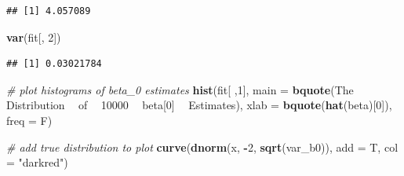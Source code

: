 \documentclass[]{book}
\newenvironment{Shaded}{\begin{snugshade}}{\end{snugshade}}
\newcommand{\KeywordTok}[1]{\textcolor[rgb]{0.13,0.29,0.53}{\textbf{#1}}}
\newcommand{\DataTypeTok}[1]{\textcolor[rgb]{0.13,0.29,0.53}{#1}}
\newcommand{\DecValTok}[1]{\textcolor[rgb]{0.00,0.00,0.81}{#1}}
\newcommand{\StringTok}[1]{\textcolor[rgb]{0.31,0.60,0.02}{#1}}
\newcommand{\CommentTok}[1]{\textcolor[rgb]{0.56,0.35,0.01}{\textit{#1}}}
\newcommand{\ControlFlowTok}[1]{\textcolor[rgb]{0.13,0.29,0.53}{\textbf{#1}}}
\newcommand{\OperatorTok}[1]{\textcolor[rgb]{0.81,0.36,0.00}{\textbf{#1}}}
\newcommand{\NormalTok}[1]{#1}
\theoremstyle{definition}
\theoremstyle{definition}
\theoremstyle{definition}
\theoremstyle{remark}
\begin{document}
\begin{Shaded}
\end{Shaded}

\begin{verbatim}
## [1] 4.057089
\end{verbatim}

\begin{Shaded}
\begin{Highlighting}[]
\KeywordTok{var}\NormalTok{(fit[, }\DecValTok{2}\NormalTok{])}
\end{Highlighting}
\end{Shaded}

\begin{verbatim}
## [1] 0.03021784
\end{verbatim}

\begin{Shaded}
\begin{Highlighting}[]
\CommentTok{# plot histograms of beta_0 estimates}
\KeywordTok{hist}\NormalTok{(fit[ ,}\DecValTok{1}\NormalTok{], }
     \DataTypeTok{main =} \KeywordTok{bquote}\NormalTok{(The }\OperatorTok{~}\StringTok{ }\NormalTok{Distribution  }\OperatorTok{~}\StringTok{ }\NormalTok{of }\OperatorTok{~}\StringTok{ }\DecValTok{10000} \OperatorTok{~}\StringTok{ }\NormalTok{beta[}\DecValTok{0}\NormalTok{] }\OperatorTok{~}\StringTok{ }\NormalTok{Estimates), }
     \DataTypeTok{xlab =} \KeywordTok{bquote}\NormalTok{(}\KeywordTok{hat}\NormalTok{(beta)[}\DecValTok{0}\NormalTok{]), }
     \DataTypeTok{freq =}\NormalTok{ F)}

\CommentTok{# add true distribution to plot}
\KeywordTok{curve}\NormalTok{(}\KeywordTok{dnorm}\NormalTok{(x, }\OperatorTok{-}\DecValTok{2}\NormalTok{, }\KeywordTok{sqrt}\NormalTok{(var_b0)), }\DataTypeTok{add =}\NormalTok{ T, }\DataTypeTok{col =} \StringTok{"darkred"}\NormalTok{)}
\end{Highlighting}
\end{Shaded}
\end{document}
